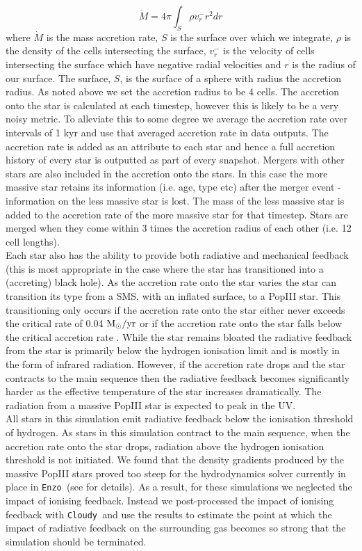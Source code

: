 \documentclass[graphics, twocolumn, usenatbib]{mn2e}
\newcommand{\enzo}{\texttt{Enzo~}}
\newcommand{\cloudy}{\texttt{Cloudy~}}
\newcommand{\msolaryr} {$\rm{M_{\odot}/yr}~$}
\begin{document}
\begin{equation}
  \dot{M} = 4\pi \int_S {\rho v_r^- r^2 dr}
\end{equation}
where $\dot{M}$ is the mass accretion rate, $S$ is the surface over which we integrate, $\rho$ is the
density of the cells intersecting the surface, $v_r^-$ is the velocity of cells intersecting
the surface which have negative radial velocities and $r$ is the radius of our surface.
The surface, $S$, is the surface of a sphere with radius the accretion radius. As noted above we
set the accretion radius to be 4 cells. The accretion onto the star is calculated at each timestep,
however this is likely to be a very noisy metric. To alleviate this to some degree we average
the accretion rate over intervals of 1 kyr and use that averaged accretion rate in data outputs. The accretion rate is added as an attribute to each star and hence a full
accretion history of every star is outputted as part of every snapshot. Mergers with other stars
are also included in the accretion onto the stars. In this case the more massive star retains its
information (i.e. age, type etc) after the merger event - information on the less massive star is
lost. The mass of the less massive star is added to the accretion rate of the more massive star for
that timestep. Stars are merged when they come within 3 times the accretion radius of each other (i.e. 12 cell lengths).\\
\indent Each star also has the ability to provide both radiative and mechanical feedback (this is
most appropriate in the case where the star has transitioned into a (accreting) black hole). As the
accretion rate onto the star varies the star can transition its type from a SMS, with an inflated
surface, to a PopIII star. This transitioning only occurs if the accretion rate onto the star either
never exceeds the critical rate of 0.04 \msolaryr or if the accretion rate onto the star falls below
the critical accretion rate \citep{Sakurai_2016}. While the star remains bloated the radiative
feedback from the star is primarily below the hydrogen ionisation limit and is mostly in the
form of infrared radiation. However, if the accretion rate drops and the star contracts to the
main sequence then the radiative feedback becomes significantly harder as the effective
temperature of the star increases dramatically. The radiation from a massive PopIII star is expected
to peak in the UV. \\
\indent All stars in this simulation emit radiative feedback below the ionisation threshold of
hydrogen. As stars in this simulation contract to the main sequence, when the accretion rate onto the
star drops, radiation above the hydrogen ionisation threshold is not initiated. We found that the
density gradients produced by the massive PopIII stars proved too steep for the hydrodynamics solver
currently in place in \enzo (see \cite{Enzo_2014} for details). As a result, for these simulations
we neglected the impact of ionising feedback. Instead we post-processed the impact of
ionising feedback with \cloudy and use the results to estimate the point at which the impact of
radiative feedback on the surrounding gas becomes so strong that the simulation should be terminated.
\end{document}
